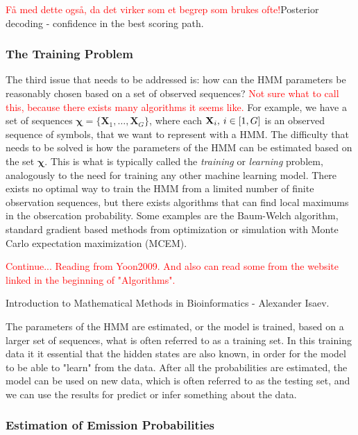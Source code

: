 \documentclass{article}
\begin{document}
\textcolor{red}{Få med dette også, da det virker som et begrep som brukes ofte!}Posterior decoding - confidence in the best scoring path.

\subsubsection{The Training Problem}
The third issue that needs to be addressed is: how can the HMM parameters be reasonably chosen based on a set of observed sequences? \textcolor{red}{Not sure what to call this, because there exists many algorithms it seems like. } For example, we have a set of sequences $\mathbf{\chi} = \{\mathbf{X}_1, \ldots, \mathbf{X}_G\}$, where each $\mathbf{X}_i, \hspace{0.2em} i \in [1,G]$ is an observed sequence of symbols, that we want to represent with a HMM. The difficulty that needs to be solved is how the parameters of the HMM can be estimated based on the set $\mathbf{\chi}$. This is what is typically called the \textit{training} or \textit{learning} problem, analogously to the need for training any other machine learning model. There exists no optimal way to train the HMM from a limited number of finite observation sequences, but there exists algorithms that can find local maximums in the obsercation probability. Some examples are the Baum-Welch algorithm, standard gradient based methods from optimization or simulation with Monte Carlo expectation maximization (MCEM). 

\textcolor{red}{Continue... Reading from Yoon2009. And also can read some from the website linked in the beginning of "Algorithms".}

Introduction to Mathematical Methods in Bioinformatics - Alexander Isaev. 

The parameters of the HMM are estimated, or the model is trained, based on a larger set of sequences, what is often referred to as a training set. In this training data it it essential that the hidden states are also known, in order for the model to be able to "learn" from the data. After all the probabilities are estimated, the model can be used on new data, which is often referred to as the testing set, and we can use the results for predict or infer something about the data. 

\subsubsection{Estimation of Emission Probabilities}
\cite{Choo2004}
\end{document}
